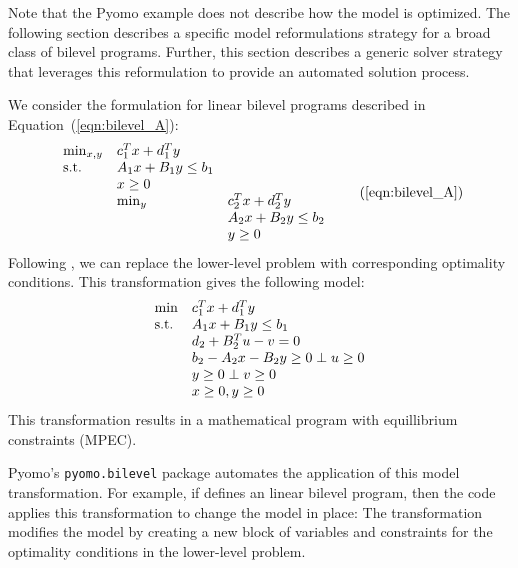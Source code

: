 Note that the Pyomo example does not describe how the model is
optimized.  The following section describes a specific model
reformulations strategy for a broad class of bilevel programs.
Further, this section describes a generic solver strategy that leverages
this reformulation to provide an automated solution process.
\fi


\label{sec:BLP}

We consider the formulation for linear bilevel programs described
in Equation~(\ref{eqn:bilevel_A}):
\begin{equation}
\begin{array}{lll}
\min_{x, y}         & c^T_1 x + d^T_1 y & \\
\st                 & A_1 x + B_1 y \leq b_1 & \\
                    & x \geq 0 & \\
                    & \min_{y}  & c^T_2 x + d^T_2 y\\
                    &           & A_2 x + B_2 y \leq b_2\\
                    &           & y \geq 0
\end{array}
\tag{\ref{eqn:bilevel_A}}
\end{equation}
Following \citet{Bard98}, we can
replace the lower-level problem with corresponding optimality
conditions.  This transformation gives the following model:
\begin{equation}
\label{eqn:bilevel_A_xfrm}
\begin{array}{ll}
\min & c^T_1 x + d^T_1 y\\
\textrm{s.t.}  & A_1 x + B_1 y \leq b_1\\
     & d_2 + B^T_2 u - v = 0\\
     & b_2 - A_2 x - B_2 y \geq 0 \perp u \geq 0\\
     & y \geq 0 \perp v \geq 0\\
     & x \geq 0, y \geq 0
\end{array}
\end{equation}
This transformation results in a mathematical program with equillibrium constraints (MPEC).

Pyomo's \texttt{pyomo.bilevel} package automates the application
of this model transformation.  For example, if  defines
an linear bilevel program,  then the code applies this transformation
to change the model in place:
The  transformation modifies the model
by creating a new block of variables and constraints for the
optimality conditions in the lower-level problem.

